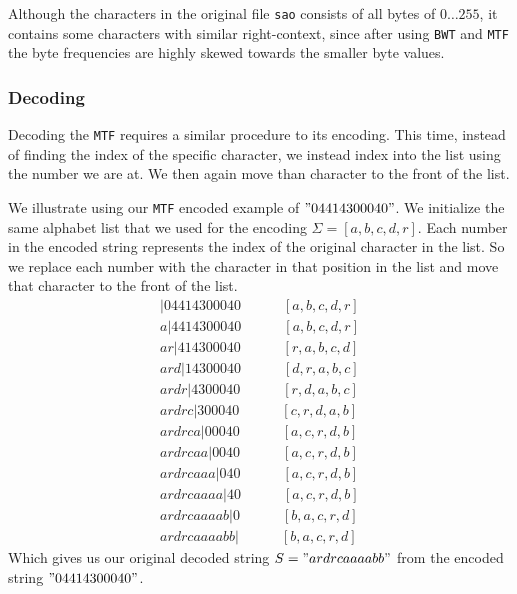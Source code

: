 \documentclass{article}
\begin{document}
Although the characters in the original file \texttt{sao} consists of all bytes of \(0 \dots 255\), it contains some characters with similar right-context, since after using \texttt{BWT} and \texttt{MTF} the byte frequencies are highly skewed towards the smaller byte values.


\subsubsection{Decoding}
Decoding the \texttt{MTF} requires a similar procedure to its encoding. This time, instead of finding the index of the specific character, we instead index into the list using the number we are at. We then again move than character to the front of the list.

We illustrate using our \texttt{MTF} encoded example of \("04414300040"\). We initialize the same alphabet list that we used for the encoding \(\Sigma = [a, b, c, d, r]\). Each number in the encoded string represents the index of the original character in the list. So we replace each number with the character in that position in the list and move that character to the front of the list.
{
    \begin{align*}
        |04414300040 \quad \quad\quad [a, b, c, d, r] \\[-4pt]
        a|4414300040 \quad \quad\quad [a, b, c, d, r] \\[-4pt]
        ar|414300040 \quad \quad\quad [r, a, b, c, d] \\[-4pt]
        ard|14300040 \quad \quad\quad [d, r, a, b, c] \\[-4pt]
        ardr|4300040 \quad \quad\quad [r, d, a, b, c] \\[-4pt]
        ardrc|300040 \quad \quad\quad [c, r, d, a, b] \\[-4pt]
        ardrca|00040 \quad \quad\quad [a, c, r, d, b] \\[-4pt]
        ardrcaa|0040 \quad \quad\quad [a, c, r, d, b] \\[-4pt]
        ardrcaaa|040 \quad \quad\quad [a, c, r, d, b] \\[-4pt]
        ardrcaaaa|40 \quad \quad\quad [a, c, r, d, b] \\[-4pt]
        ardrcaaaab|0 \quad \quad\quad [b, a, c, r, d] \\[-4pt]
        ardrcaaaabb| \quad \quad\quad [b, a, c, r, d]
    \end{align*}
}
Which gives us our original decoded string \(S="ardrcaaaabb"\) from the encoded string \("04414300040"\).
\end{document}

